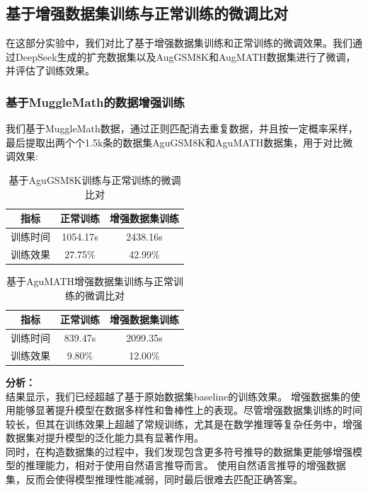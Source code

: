 \documentclass{article}
\begin{document}
\subsection{基于增强数据集训练与正常训练的微调比对}
在这部分实验中，我们对比了基于增强数据集训练和正常训练的微调效果。我们通过DeepSeek生成的扩充数据集以及AugGSM8K和AugMATH数据集进行了微调，并评估了训练效果。
\subsubsection{基于MuggleMath的数据增强训练}
我们基于MuggleMath数据，通过正则匹配消去重复数据，并且按一定概率采样，最后提取出两个个1.5k条的数据集AguGSM8K和AguMATH数据集，用于对比微调效果:

\begin{table}[H]
  \caption{基于AguGSM8K训练与正常训练的微调比对}
  \label{gsm8k-augmentation-comparison-table}
  \centering
  \begin{tabular}{|c|c|c|}
    \hline
    \textbf{指标} & \textbf{正常训练} & \textbf{增强数据集训练} \\ \hline
    训练时间 & 1054.17s & 2438.16s \\ \hline
    训练效果 & 27.75\% & 42.99\% \\ \hline
  \end{tabular}
\end{table}


\begin{table}[H]
  \caption{基于AguMATH增强数据集训练与正常训练的微调比对}
  \label{math-augmentation-comparison-table}
  \centering
  \begin{tabular}{|c|c|c|}
    \hline
    \textbf{指标} & \textbf{正常训练} & \textbf{增强数据集训练} \\ \hline
    训练时间 & 839.47s & 2099.35s \\ \hline
    训练效果 & 9.80\% & 12.00\% \\ \hline
  \end{tabular}
\end{table}
\textbf{分析：}\\
结果显示，我们已经超越了基于原始数据集baseline的训练效果。
增强数据集的使用能够显著提升模型在数据多样性和鲁棒性上的表现。尽管增强数据集训练的时间较长，但其在训练效果上超越了常规训练，尤其是在数学推理等复杂任务中，增强数据集对提升模型的泛化能力具有显著作用。
\\
同时，在构造数据集的过程中，我们发现包含更多符号推导的数据集更能够增强模型的推理能力，相对于使用自然语言推导而言。
使用自然语言推导的增强数据集，反而会使得模型推理性能减弱，同时最后很难去匹配正确答案。
\end{document}
